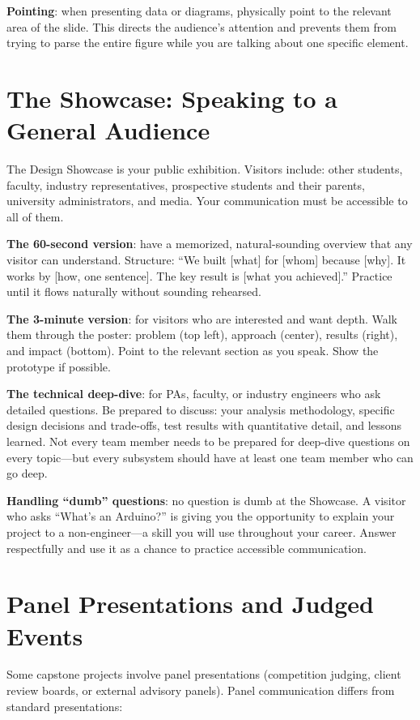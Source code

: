 \textbf{Pointing}: when presenting data or diagrams, physically point to the relevant area of the slide. This directs the audience's attention and prevents them from trying to parse the entire figure while you are talking about one specific element.



\section{The Showcase: Speaking to a General Audience}
The Design Showcase is your public exhibition. Visitors include: other students, faculty, industry representatives, prospective students and their parents, university administrators, and media. Your communication must be accessible to all of them.

\textbf{The 60-second version}: have a memorized, natural-sounding overview that any visitor can understand. Structure: ``We built [what] for [whom] because [why]. It works by [how, one sentence]. The key result is [what you achieved].'' Practice until it flows naturally without sounding rehearsed.

\textbf{The 3-minute version}: for visitors who are interested and want depth. Walk them through the poster: problem (top left), approach (center), results (right), and impact (bottom). Point to the relevant section as you speak. Show the prototype if possible.

\textbf{The technical deep-dive}: for PAs, faculty, or industry engineers who ask detailed questions. Be prepared to discuss: your analysis methodology, specific design decisions and trade-offs, test results with quantitative detail, and lessons learned. Not every team member needs to be prepared for deep-dive questions on every topic---but every subsystem should have at least one team member who can go deep.

\textbf{Handling ``dumb'' questions}: no question is dumb at the Showcase. A visitor who asks ``What's an Arduino?'' is giving you the opportunity to explain your project to a non-engineer---a skill you will use throughout your career. Answer respectfully and use it as a chance to practice accessible communication.

\section{Panel Presentations and Judged Events}
Some capstone projects involve panel presentations (competition judging, client review boards, or external advisory panels). Panel communication differs from standard presentations:

